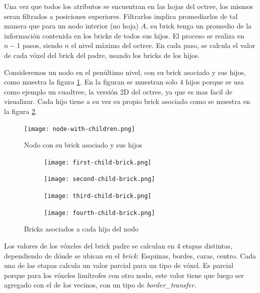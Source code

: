 Una vez que todos los atributos se encuentran en las hojas del octree, los mismos seran filtrados a posiciones superiores.
Filtrarlos implica promediarlos de tal manera que para un nodo interior (no hoja) $A$, su brick tenga un promedio de la información contenida en los bricks de todos sus hijos.
El proceso se realiza en $n - 1$ pasos, siendo $n$ el nivel máximo del octree.
En cada paso, se calcula el valor de cada vóxel del brick del padre, usando los bricks de los hijos.

Consideremos un nodo en el penúltimo nivel, con su brick asociado y sus hijos, como muestra la figura \ref{fig:node_with_children}.
En la figuran se muestran solo $4$ hijos porque se usa como ejemplo un cuadtree, la versión 2D del octree, ya que es mas facil de visualizar.
Cada hijo tiene a su vez su propio brick asociado como se muestra en la figura \ref{fig:all_child_bricks}.

\begin{figure}[h!]
    \centering
    \texttt{[image: node-with-children.png]}
    \caption{Nodo con su brick asociado y sus hijos}
    \label{fig:node_with_children}
\end{figure}

\begin{figure}[h!]
    \begin{center}
        \begin{subfigure}{.24\textwidth}
            \texttt{[image: first-child-brick.png]}
        \end{subfigure}
        \begin{subfigure}{.24\textwidth}
            \texttt{[image: second-child-brick.png]}
        \end{subfigure}
        \begin{subfigure}{.24\textwidth}
            \texttt{[image: third-child-brick.png]}
        \end{subfigure}
        \begin{subfigure}{.24\textwidth}
            \texttt{[image: fourth-child-brick.png]}
        \end{subfigure}
    \end{center}
    \caption{Bricks asociados a cada hijo del nodo}
    \label{fig:all_child_bricks}
\end{figure}

Los valores de los vóxeles del brick padre se calculan en 4 etapas distintas, dependiendo de dónde se ubican en el \textit{brick}: Esquinas, bordes, caras, centro.
Cada una de las etapas calcula un valor parcial para un tipo de vóxel.
Es parcial porque para los vóxeles limítrofes con otro nodo, este valor tiene que luego ser agregado con el de los vecinos, con un tipo de \textit{border\_transfer}.

